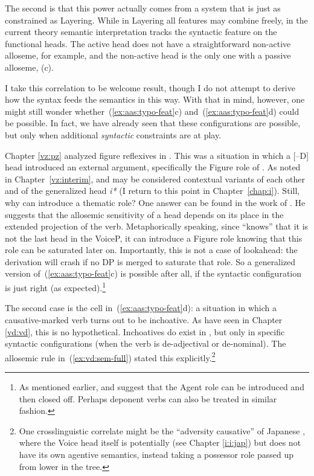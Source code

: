 The second is that this power actually comes from a system that is just as constrained as Layering. While in Layering all features may combine freely, in the current theory semantic interpretation tracks the syntactic feature on the functional heads. The active {\vd} head does not have a straightforward non-active alloseme, for example, and the non-active {\vz} head is the only one with a passive alloseme, (\lastx c).

I take this correlation to be welcome result, though I do not attempt to derive how the syntax feeds the semantics in this way. With that in mind, however, one might still wonder whether~(\ref{ex:aas:typo-feat}c) and~(\ref{ex:aas:typo-feat}d) could be possible. In fact, we have already seen that these configurations are possible, but only when additional \emph{syntactic} constraints are at play.

Chapter \ref{vz:pz} analyzed figure reflexives in {\tnif}. This was a situation in which a [--D] head introduced an external argument, specifically the Figure role of {\pz}. As noted in Chapter~\ref{vz:interim}, {\pz} and {\vz} may be considered contextual variants of each other and of the generalized head \emph{i*} (I return to this point in Chapter~\ref{chap:i}). Still, why can {\pz} introduce a thematic role? One answer can be found in the work of \cite{wood15springer}. He suggests that the allosemic sensitivity of a head depends on its place in the extended projection of the verb. Metaphorically speaking, since {\pz} ``knows'' that it is not the last head in the VoiceP, it can introduce a Figure role knowing that this role can be saturated later on. Importantly, this is not a case of lookahead: the derivation will crash if no DP is merged to saturate that role. So a generalized version of~(\ref{ex:aas:typo-feat}c) is possible after all, if the syntactic configuration is just right (as expected).\footnote{As mentioned earlier, \cite{legate14} and \cite{akkus19jl} suggest that the Agent role can be introduced and then closed off. Perhaps deponent verbs can also be treated in similar fashion.}

The second case is the cell in~(\ref{ex:aas:typo-feat}d): a situation in which a causative-marked verb turns out to be inchoative. As have seen in Chapter \ref{vd:vd}, this is no hypothetical. Inchoatives do exist in {\thif}, but only in specific syntactic configurations (when the verb is de-adjectival or de-nominal). The allosemic rule in~(\ref{ex:vd:sem-full}) stated this explicitly.\footnote{One crosslinguistic correlate might be the ``adversity causative'' of Japanese \citep{pylkkanen08,woodmarantz17}, where the Voice head itself is potentially {\vd} (see Chapter \ref{i:i:jap}) but does not have its own agentive semantics, instead taking a possessor role passed up from lower in the tree.}

